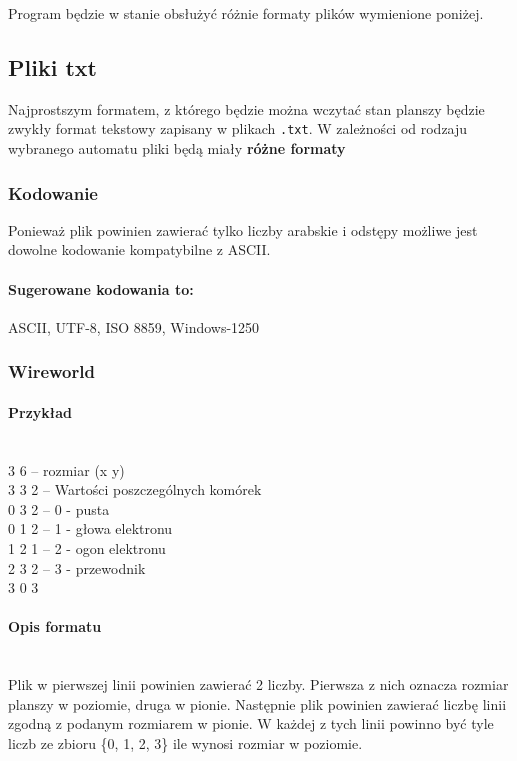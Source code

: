 \documentclass{report}
\begin{document}
Program będzie w stanie obsłużyć różnie formaty plików wymienione poniżej.

\subsection{Pliki txt}
Najprostszym formatem, z którego będzie można wczytać stan planszy będzie zwykły format tekstowy zapisany w plikach \texttt{.txt}. W zależności od rodzaju wybranego automatu pliki będą miały \textbf{różne formaty}

\subsubsection{Kodowanie}
Ponieważ plik powinien zawierać tylko liczby arabskie i odstępy możliwe jest dowolne kodowanie kompatybilne z ASCII. \\
\paragraph{Sugerowane kodowania to:}
ASCII, UTF-8, ISO 8859, Windows-1250

\subsubsection{Wireworld}

\begin{samepage}
\paragraph{Przykład}\mbox{}\\
3 6 \tab -- rozmiar (x y) \\
3 3 2 \tab -- Wartości poszczególnych komórek \\
0 3 2 \tab -- 0 - pusta \\
0 1 2 \tab -- 1 - głowa elektronu \\
1 2 1 \tab -- 2 - ogon elektronu \\
2 3 2 \tab -- 3 - przewodnik \\
3 0 3 \\
\end{samepage}

\paragraph{Opis formatu}\mbox{}\\
Plik w pierwszej linii powinien zawierać 2 liczby. Pierwsza z nich oznacza rozmiar planszy w poziomie, druga w pionie.
Następnie plik powinien zawierać liczbę linii zgodną z podanym rozmiarem w pionie. W każdej z tych linii powinno być tyle liczb ze zbioru \{0, 1, 2, 3\} ile wynosi rozmiar w poziomie.
\end{document}
